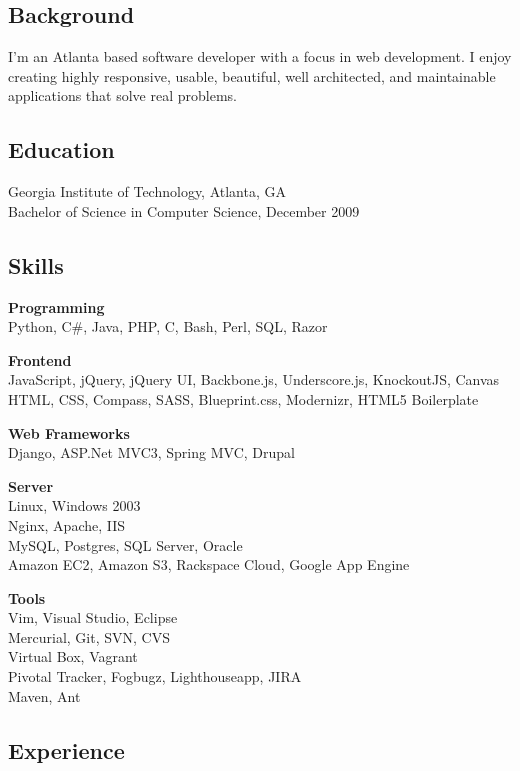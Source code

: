\subsection{Background}

I'm an Atlanta based software developer with a focus in web development.
I enjoy creating highly responsive, usable, beautiful, well architected,
and maintainable applications that solve real problems.

\subsection{Education}

Georgia Institute of Technology, Atlanta, GA\\Bachelor of Science in
Computer Science, December 2009

\subsection{Skills}

\textbf{Programming}\\Python, C\#, Java, PHP, C, Bash, Perl, SQL, Razor

\textbf{Frontend}\\JavaScript, jQuery, jQuery UI, Backbone.js,
Underscore.js, KnockoutJS, Canvas\\HTML, CSS, Compass, SASS,
Blueprint.css, Modernizr, HTML5 Boilerplate

\textbf{Web Frameworks}\\Django, ASP.Net MVC3, Spring MVC, Drupal

\textbf{Server}\\Linux, Windows 2003\\Nginx, Apache, IIS\\MySQL,
Postgres, SQL Server, Oracle\\Amazon EC2, Amazon S3, Rackspace Cloud,
Google App Engine

\textbf{Tools}\\Vim, Visual Studio, Eclipse\\Mercurial, Git, SVN,
CVS\\Virtual Box, Vagrant\\Pivotal Tracker, Fogbugz, Lighthouseapp,
JIRA\\Maven, Ant

\subsection{Experience}

